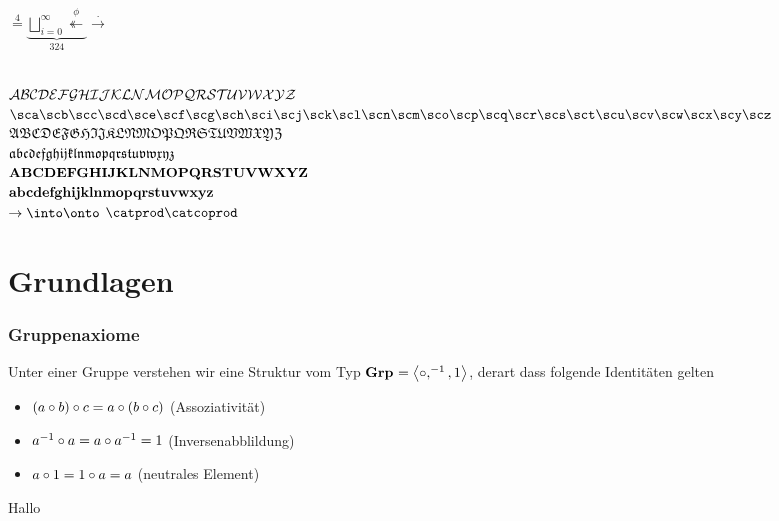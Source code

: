 \documentclass{article}
\begin{document}
$\stackrel{4}{=} \underbrace{\bigsqcup\limits_{i=0}^{\infty} \stackrel{\phi}{\twoheadleftarrow}}_{324} \stackrel{.}{\rightarrow}$ 
\\
$\scA\scB\scC\scD\scE\scF\scG\scH\scI\scJ\scK\scL\scN\scM\scO\scP\scQ\scR\scS\scT\scU\scV\scW\scX\scY\scZ$\\
$\sca\scb\scc\scd\sce\scf\scg\sch\sci\scj\sck\scl\scn\scm\sco\scp\scq\scr\scs\sct\scu\scv\scw\scx\scy\scz$\\
$\fkA\fkB\fkC\fkD\fkE\fkF\fkG\fkH\fkI\fkJ\fkK\fkL\fkN\fkM\fkO\fkP\fkQ\fkR\fkS\fkT\fkU\fkV\fkW\fkX\fkY\fkZ$\\
$\fka\fkb\fkc\fkd\fke\fkf\fkg\fkh\fki\fkj\fkk\fkl\fkn\fkm\fko\fkp\fkq\fkr\fks\fkt\fku\fkv\fkw\fkx\fky\fkz$\\
$\bfA\bfB\bfC\bfD\bfE\bfF\bfG\bfH\bfI\bfJ\bfK\bfL\bfN\bfM\bfO\bfP\bfQ\bfR\bfS\bfT\bfU\bfV\bfW\bfX\bfY\bfZ$\\
$\bfa\bfb\bfc\bfd\bfe\bff\bfg\bfh\bfi\bfj\bfk\bfl\bfn\bfm\bfo\bfp\bfq\bfr\bfs\bft\bfu\bfv\bfw\bfx\bfy\bfz$\\
$\to\into\onto$
$\catprod\catcoprod$

\part{Grundlagen}

\section{Gruppenaxiome}

Unter einer Gruppe verstehen wir eine Struktur vom Typ $\Grp=\struct{\compose,^{-1},1}$, derart dass folgende Identitäten gelten
\begin{itemize}
        \item $(a\compose b)\compose c = a\compose (b\compose c)$ (Assoziativität)
        \item $a^{-1}\compose a = a\compose a^{-1} = 1$ (Inversenabblildung)
    \item $a\compose 1 = 1\compose a = a$ (neutrales Element)
\end{itemize}

\begin{theorem}
    Hallo
\end{theorem}
\end{document}
